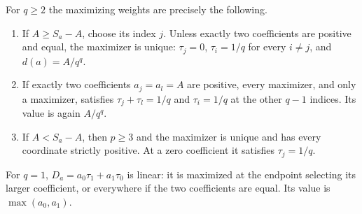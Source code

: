 \begin{theorem}
For $q\ge2$ the maximizing weights are precisely the following.
\begin{enumerate}
\item If $A\ge S_a-A$, choose its index $j$. Unless exactly two
coefficients are positive and equal, the maximizer is unique:
$\tau_j=0$, $\tau_i=1/q$ for every $i\ne j$, and
$d(a)=A/q^q$.
\item If exactly two coefficients $a_j=a_l=A$ are positive, every
maximizer, and only a maximizer, satisfies
$\tau_j+\tau_l=1/q$ and $\tau_i=1/q$ at the other $q-1$ indices.
Its value is again $A/q^q$.
\item If $A<S_a-A$, then $p\ge3$ and the maximizer is unique and
has every coordinate strictly positive. At a zero coefficient it
satisfies $\tau_j=1/q$.
\end{enumerate}
For $q=1$, $D_a=a_0\tau_1+a_1\tau_0$ is linear: it is maximized
at the endpoint selecting its larger coefficient, or everywhere if
the two coefficients are equal. Its value is $\max(a_0,a_1)$.
\end{theorem}
